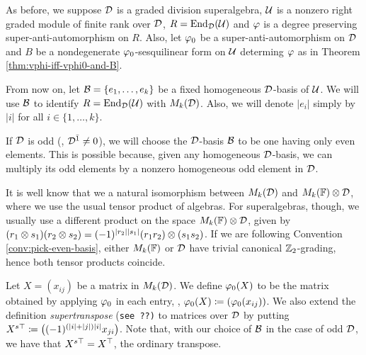 As before, we suppose $\mathcal{D}$ is a graded division superalgebra, $\mathcal U$ is a nonzero right graded module of finite rank over $\mathcal{D}$, $R = \operatorname{End}_{\mathcal{D}} (\mathcal U)$ and $\varphi$ is a degree preserving super-anti-automorphism on $R$. 
Also, let $\varphi_0$ be a super-anti-automorphism on $\mathcal{D}$ and $B$ be a nondegenerate $\varphi_0$-sesquilinear form on $\mathcal U$ determing $\varphi$ as in Theorem \ref{thm:vphi-iff-vphi0-and-B}.

From now on, let $\mathcal B = \{e_1, \ldots, e_k\}$ be a fixed homogeneous $\mathcal{D}$-basis of $\mathcal U$. 
We will use $\mathcal B$ to identify $R = \operatorname{End}_{\mathcal{D}} (\mathcal U)$ with $M_k (\mathcal{D})$. 
Also, we will denote $|e_i|$ simply by $|i|$ for all $i \in \{1, \ldots, k\}$. 


\begin{convention}\label{conv:pick-even-basis}
    If $\mathcal{D}$ is odd (\ie, $\mathcal{D}^{\bar1} \neq 0$), we will choose the $\mathcal{D}$-basis $\mathcal B$ to be one having only even elements. 
    This is possible because, given any homogeneous $\mathcal{D}$-basis, we can multiply its odd elements by a nonzero homogeneous odd element in $\mathcal{D}$. 
\end{convention}

\begin{remark}
    It is well know that we a natural isomorphism between $M_k(\mathcal{D})$ and $M_k(\mathbb{F})\otimes \mathcal{D}$, where we use the usual tensor product of algebras. 
    For superalgebras, though, we usually use a different product on the space $M_k(\mathbb{F})\otimes \mathcal{D}$, given by $(r_1 \otimes s_1) (r_2 \otimes s_2) = (-1)^{|r_2||s_1|} (r_1 r_2) \otimes (s_1 s_2)$. 
    If we are following Convention \ref{conv:pick-even-basis}, either $M_k(\mathbb{F})$ or $\mathcal{D}$ have trivial canonical $\mathbb{Z}_2$-grading, hence both tensor products coincide.
\end{remark}

\begin{defi}
    Let $X = (x_{ij})$ be a matrix in $M_k (\mathcal{D})$. 
    We define $\varphi_0 (X)$ to be the matrix obtained by applying $\varphi_0$ in each entry, \ie, $\varphi_0 (X) \coloneqq (\varphi_0(x_{ij}))$. 
    We also extend the definition \emph{supertranspose} {(\tt see ??)} to matrices over $\mathcal{D}$ by putting $X^{s\top} \coloneqq \big((-1)^{(|i| + |j|) |i|} x_{ji} \big)$. 
    Note that, with our choice of $\mathcal B$ in the case of odd $\mathcal{D}$, we have that $X^{s\top} = X^{\top}$, the ordinary transpose.
\end{defi}

